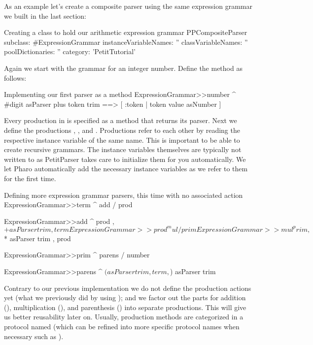 \documentclass[a4paper,10pt,twoside]{book}
\begin{document}
As an example let's create a composite parser using the same
expression grammar we built in the last section:

\begin{script}{Creating a class to hold our arithmetic expression grammar}
PPCompositeParser subclass: #ExpressionGrammar
   instanceVariableNames: ''
   classVariableNames: ''
   poolDictionaries: ''
   category: 'PetitTutorial'
\end{script}

Again we start with the grammar for an integer number. Define the
method  as follows:

\begin{script}{Implementing our first parser as a method}
ExpressionGrammar>>number
   ^ #digit asParser plus token trim ==> [ :token | token value asNumber ]
\end{script}

Every production in  is specified as a method
that returns its parser. Next we define the productions ,
, and . Productions refer to each other by reading
the respective instance variable of the same name. This is important
to be able to create recursive grammars. The instance variables
themselves are typically not written to as PetitParser takes care to
initialize them for you automatically. We let Pharo automatically add
the necessary instance variables as we refer to them for the first
time.

\begin{script}{Defining more expression grammar parsers, this time with no associated action}
ExpressionGrammar>>term
   ^ add / prod

ExpressionGrammar>>add
   ^ prod , $+ asParser trim , term

ExpressionGrammar>>prod
   ^ mul / prim

ExpressionGrammar>>mul
   ^ prim , $* asParser trim , prod

ExpressionGrammar>>prim
   ^ parens / number

ExpressionGrammar>>parens
   ^ $( asParser trim , term , $) asParser trim
\end{script}

Contrary to our previous implementation we do not define the
production actions yet (what we previously did by using
\ppmthind{==>}); and we factor out the parts for addition (),
multiplication (), and parenthesis () into separate
productions. This will give us better reusability later on. Usually,
production methods are categorized in a protocol named 
(which can be refined into more specific protocol names when necessary
such as ).
\end{document}
